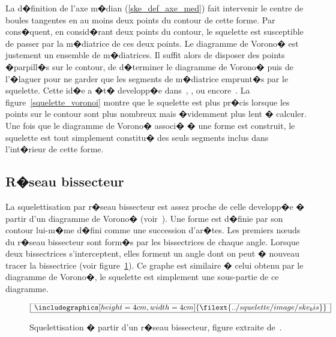 La d�finition de l'axe m�dian (\ref{ske_def_axe_med}) fait intervenir le centre de boules tangentes en au moins deux points du contour de cette forme. Par cons�quent, en consid�rant deux points du contour, le squelette est susceptible de passer par la m�diatrice de ces deux points. Le diagramme de Vorono� est justement un ensemble de m�diatrices. Il suffit alors de disposer des points �parpill�s sur le contour, de d�terminer le diagramme de Vorono� puis de l'�laguer pour ne garder que les segments de m�diatrice emprunt�s par le squelette. Cette id�e a �t� developp�e dans~, , ou encore~. La figure~\ref{squelette_voronoi} montre que le squelette est plus pr�cis lorsque les points sur le contour sont plus nombreux mais �videmment plus lent � calculer. Une fois que le diagramme de Vorono� associ� � une forme est construit, le squelette est tout simplement constitu� des seuls segments inclus dans l'int�rieur de cette forme.






\subsection{R�seau bissecteur}
\label{ske_reseau_bissecteur}

La squelettisation par r�seau bissecteur est assez proche de celle developp�e � partir d'un diagramme de Vorono� (voir~). Une forme est d�finie par son contour lui-m�me d�fini comme une succession d'ar�tes. Les premiers  n\oe uds du r�seau bissecteur sont form�s par les bissectrices de chaque angle. Lorsque deux bissectrices s'interceptent, elles forment un angle dont on peut � nouveau tracer la bissectrice (voir figure~\ref{squelette_reseau_bissecteur}). Ce graphe est similaire � celui obtenu par le diagramme de Vorono�, le squelette est simplement une sous-partie de ce diagramme.



            \begin{figure}[ht]
        $$\frame{$\begin{array}[c]{c}\includegraphics[height=4cm, width=4cm]
        {\filext{../squelette/image/ske_bis}}\end{array}$}$$
        \caption{    Squelettisation � partir d'un r�seau bissecteur, figure extraite de~.}
        \label{squelette_reseau_bissecteur}
            \end{figure}
















